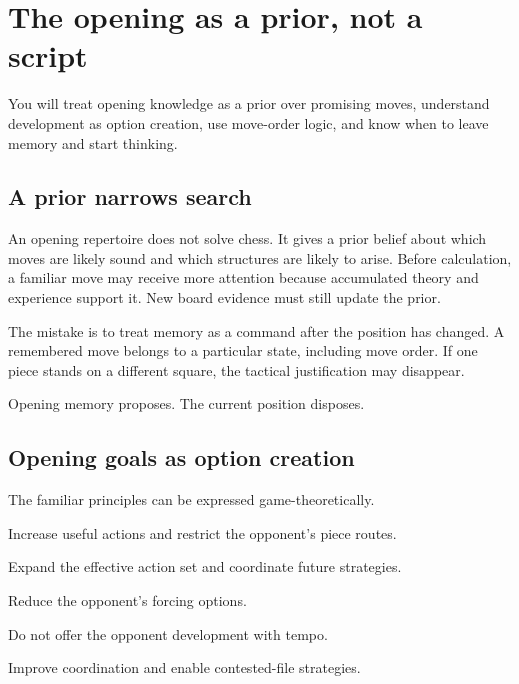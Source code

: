 \chapter{The opening as a prior, not a script}
\begin{learningbox}
You will treat opening knowledge as a prior over promising moves, understand development as option creation, use move-order logic, and know when to leave memory and start thinking.
\end{learningbox}

\section{A prior narrows search}
An opening repertoire does not solve chess. It gives a prior belief about which moves are likely sound and which structures are likely to arise. Before calculation, a familiar move may receive more attention because accumulated theory and experience support it. New board evidence must still update the prior.

The mistake is to treat memory as a command after the position has changed. A remembered move belongs to a particular state, including move order. If one piece stands on a different square, the tactical justification may disappear.

\begin{intuitionbox}
Opening memory proposes. The current position disposes.
\end{intuitionbox}

\section{Opening goals as option creation}
The familiar principles can be expressed game-theoretically.

\begin{description}[style=nextline,leftmargin=2.4em,labelsep=.5em]
\item[Control the center.] Increase useful actions and restrict the opponent's piece routes.
\item[Develop pieces.] Expand the effective action set and coordinate future strategies.
\item[Secure the king.] Reduce the opponent's forcing options.
\item[Avoid premature queen moves.] Do not offer the opponent development with tempo.
\item[Connect rooks.] Improve coordination and enable contested-file strategies.
\end{description}

